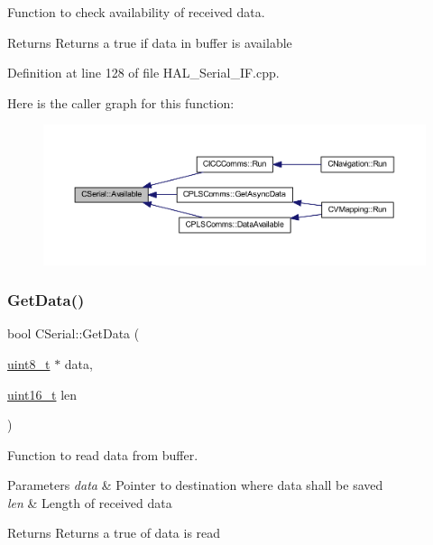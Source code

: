 Function to check availability of received data. 

\begin{DoxyReturn}{Returns}
Returns a true if data in buffer is available 
\end{DoxyReturn}


Definition at line 128 of file H\+A\+L\+\_\+\+Serial\+\_\+\+I\+F.\+cpp.

Here is the caller graph for this function\+:\nopagebreak
\begin{figure}[H]
\begin{center}
\leavevmode
\includegraphics[width=350pt]{class_c_serial_abb43734223d937a86e7616636ea16024_icgraph}
\end{center}
\end{figure}
\mbox{\label{class_c_serial_abad86c07f530569b2ceeea75bda485ad}} 
\subsubsection{\texorpdfstring{Get\+Data()}{GetData()}}
{\footnotesize\ttfamily bool C\+Serial\+::\+Get\+Data (\begin{DoxyParamCaption}\item[{\mbox{\hyperlink{_a_d_a_s___types_8h_aba7bc1797add20fe3efdf37ced1182c5}{uint8\+\_\+t}} $\ast$}]{data,  }\item[{\mbox{\hyperlink{_a_d_a_s___types_8h_a1f1825b69244eb3ad2c7165ddc99c956}{uint16\+\_\+t}}}]{len }\end{DoxyParamCaption})}



Function to read data from buffer. 


\begin{DoxyParams}{Parameters}
{\em data} & Pointer to destination where data shall be saved \\
\hline
{\em len} & Length of received data \\
\hline
\end{DoxyParams}
\begin{DoxyReturn}{Returns}
Returns a true of data is read 
\end{DoxyReturn}


